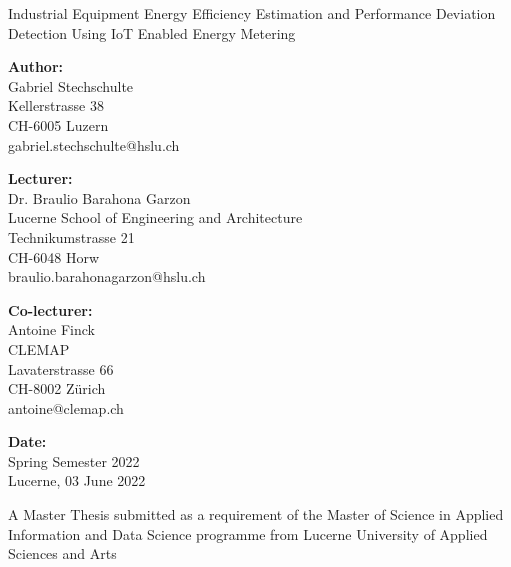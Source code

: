 \begin{titlepage}
    \begin{center}
        \vfill
        
        \huge{Industrial Equipment Energy Efficiency Estimation and Performance Deviation Detection Using IoT Enabled Energy Metering}
        
        \vfill
        
        \large{\textbf{Author:} \\
            Gabriel Stechschulte \\
            Kellerstrasse 38 \\
            CH-6005 Luzern \\
            gabriel.stechschulte@hslu.ch} \\ [8pt]
            
        \vfill
        
        \large{\textbf{Lecturer:} \\
            Dr. Braulio Barahona Garzon \\
            Lucerne School of Engineering and Architecture \\
            Technikumstrasse 21 \\
            CH-6048 Horw \\
            braulio.barahonagarzon@hslu.ch} \\ [8pt]
            
        \vfill
        
        \large{\textbf{Co-lecturer:} \\
            Antoine Finck \\
            CLEMAP \\
            Lavaterstrasse 66 \\
            CH-8002 Zürich \\
            antoine@clemap.ch} \\ [8pt]
        
        \vfill
        
        \large{\textbf{Date:} \\
            Spring Semester 2022 \\
            Lucerne, 03 June 2022} \\[8pt]
        
        \vfill
        
        A Master Thesis submitted as a requirement of the Master of Science in Applied Information and Data Science programme from Lucerne University of Applied Sciences and Arts
    \end{center}
\end{titlepage}